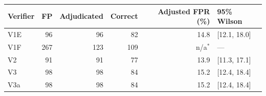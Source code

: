 \begin{tabular}{lrrrrl}
\toprule
Verifier & FP & Adjudicated & Correct & Adjusted FPR (\%) & 95\% Wilson \\
\midrule
V1E & 96 & 96 & 82 & 14.8 & [12.1, 18.0] \\
V1F & 267 & 123 & 109 & n/a$^{*}$ & --- \\
V2 & 91 & 91 & 77 & 13.9 & [11.3, 17.1] \\
V3 & 98 & 98 & 84 & 15.2 & [12.4, 18.4] \\
V3a & 98 & 98 & 84 & 15.2 & [12.4, 18.4] \\
\bottomrule
\end{tabular}
